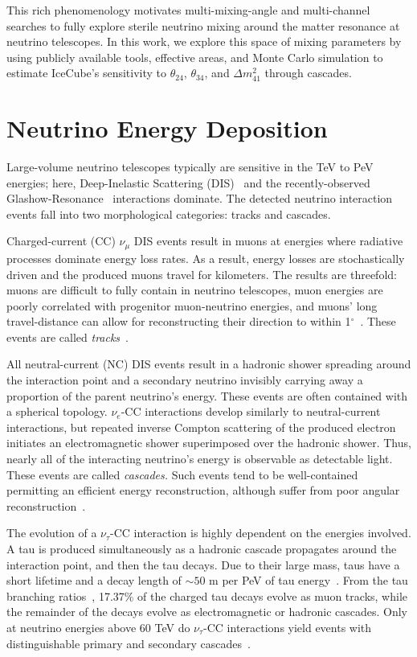 \documentclass[main.tex]{subfiles}
\begin{document}
This rich phenomenology motivates multi-mixing-angle and multi-channel searches to fully explore sterile neutrino mixing around the matter resonance at neutrino telescopes. In this work, we explore this space of mixing parameters by using publicly available tools, effective areas, and Monte Carlo simulation to estimate IceCube's sensitivity to $\theta_{24}$, $\theta_{34}$, and $\Delta m_{41}^{2}$ through cascades.

\section{\label{sec:depo} Neutrino Energy Deposition}


Large-volume neutrino telescopes typically are sensitive in the TeV to PeV energies; here, Deep-Inelastic Scattering (DIS)~\cite{gandhineutrinos} and the recently-observed~\cite{IceCube:2021rpz} Glashow-Resonance~\cite{PhysRev.118.316} interactions dominate. 
The detected neutrino interaction events fall into two morphological categories: tracks and cascades.

Charged-current (CC) $\nu_{\mu}$ DIS events result in muons at energies where radiative processes dominate energy loss rates.
As a result, energy losses are stochastically driven and the produced muons travel for kilometers. 
The results are threefold: muons are difficult to fully contain in neutrino telescopes, muon energies are poorly correlated with progenitor muon-neutrino energies, and muons' long travel-distance can allow for reconstructing their direction to within 1$^{\circ}$~\cite{trackaccuracy2017}. These events are called \textit{tracks}~\cite{icecube_energy_reco}.

All neutral-current (NC) DIS events result in a hadronic shower spreading around the interaction point and a secondary neutrino invisibly carrying away a proportion of the parent neutrino's energy. 
These events are often contained with a spherical topology. 
$\nu_{e}$-CC interactions develop similarly to neutral-current interactions, but repeated inverse Compton scattering of the produced electron initiates an electromagnetic shower superimposed over the hadronic shower. 
Thus, nearly all of the interacting neutrino's energy is observable as detectable light. 
These events are called \textit{cascades.} Such events tend to be well-contained permitting an efficient energy reconstruction, although suffer from poor angular reconstruction~\cite{icecube_energy_reco}. 

The evolution of a $\nu_{\tau}$-CC interaction is highly dependent on the energies involved. A tau is produced simultaneously as a hadronic cascade propagates around the interaction point, and then the tau decays. 
Due to their large mass, taus have a short lifetime and a decay length of $\sim 50$ m per PeV of tau energy~\cite{abbasi2020measurement}. 
From the tau branching ratios~\cite{PhysRevD.98.030001}, 17.37\% of the charged tau decays evolve as muon tracks, while the remainder of the decays evolve as electromagnetic or hadronic cascades. Only at neutrino energies above 60 TeV do $\nu_{\tau}$-CC interactions yield events with distinguishable primary and secondary cascades~\cite{abbasi2020measurement}.
\end{document}
